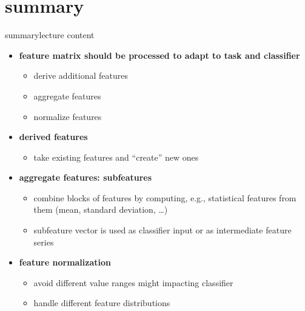     \section{summary}
        \begin{frame}{summary}{lecture content}
            \begin{itemize}
                \item   \textbf{feature matrix should be processed to adapt to task and classifier}
                    \begin{itemize}
                        \item   derive additional features
                        \item   aggregate features
                        \item   normalize features
                    \end{itemize}
                \bigskip
                \item   \textbf{derived features}
                    \begin{itemize}
                        \item   take existing features and ``create'' new ones
                    \end{itemize}
                \bigskip
                \item   \textbf{aggregate features: subfeatures}
                    \begin{itemize}
                        \item   combine blocks of features by computing, e.g., statistical features from them (mean, standard deviation, \ldots)
                        \item   subfeature vector is used as classifier input or as intermediate feature series
                    \end{itemize}
                \bigskip
                \item   \textbf{feature normalization}
                    \begin{itemize}
                        \item   avoid different value ranges might impacting classifier
                        \item   handle different feature distributions
                    \end{itemize}
            \end{itemize}
        \end{frame}

